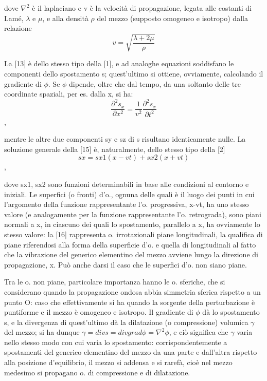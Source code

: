 \documentclass[a4paper]{article}
\begin{document}
dove $\nabla^2$ è il laplaciano e v è la velocità di propagazione, legata alle costanti di Lamé, $\lambda$ e $\mu$, e alla densità $\rho$ del mezzo (supposto omogeneo e isotropo) dalla relazione 
\begin{equation}
v=\sqrt{\frac{\lambda+2\mu}{\rho}}
\end{equation}

La [13] è dello stesso tipo della [1], e ad analoghe equazioni soddisfano le componenti dello spostamento s; quest'ultimo si ottiene, ovviamente, calcolando il gradiente di $\phi$. Se $\phi$ dipende, oltre che dal tempo, da una soltanto delle tre coordinate spaziali, per es. dalla x, si ha:
\begin{equation}
\frac{\partial^2 s_x}{\partial x^2}=\frac{1}{v^2}\frac{\partial^2 s_x}{\partial t^2}
\end{equation},

mentre le altre due componenti sy e sz di s risultano identicamente nulle. La soluzione generale della [15] è, naturalmente, dello stesso tipo della [2]
\begin{equation}
sx = sx1(x - vt) + sx2(x + vt)
\end{equation},

dove sx1, sx2 sono funzioni determinabili in base alle condizioni al contorno e iniziali. Le superfici (o fronti) d'o., ognuna delle quali è il luogo dei punti in cui l'argomento della funzione rappresentante l'o. progressiva, x-vt, ha uno stesso valore (e analogamente per la funzione rappresentante l'o. retrograda), sono piani normali a x, in ciascuno dei quali lo spostamento, parallelo a x, ha ovviamente lo stesso valore: la [16] rappresenta o. irrotazionali piane longitudinali, la qualifica di piane riferendosi alla forma della superficie d'o. e quella di longitudinali al fatto che la vibrazione del generico elementino del mezzo avviene lungo la direzione di propagazione, x. Può anche darsi il caso che le superfici d'o. non siano piane.

Tra le o. non piane, particolare importanza hanno le o. sferiche, che si considerano quando la propagazione ondosa abbia simmetria sferica rispetto a un punto O: caso che effettivamente si ha quando la sorgente della perturbazione è puntiforme e il mezzo è omogeneo e isotropo. Il gradiente di $\phi$ dà lo spostamento s, e la divergenza di quest'ultimo dà la dilatazione (o compressione) volumica $\gamma$ del mezzo; si ha dunque $\gamma=div s=div grad \phi=\nabla^2 \phi$, e ciò significa che $\gamma$ varia nello stesso modo con cui varia lo spostamento: corrispondentemente a spostamenti del generico elementino del mezzo da una parte e dall'altra rispetto alla posizione d'equilibrio, il mezzo si addensa e si rarefà, cioè nel mezzo medesimo si propagano o. di compressione e di dilatazione. 
\end{document}
